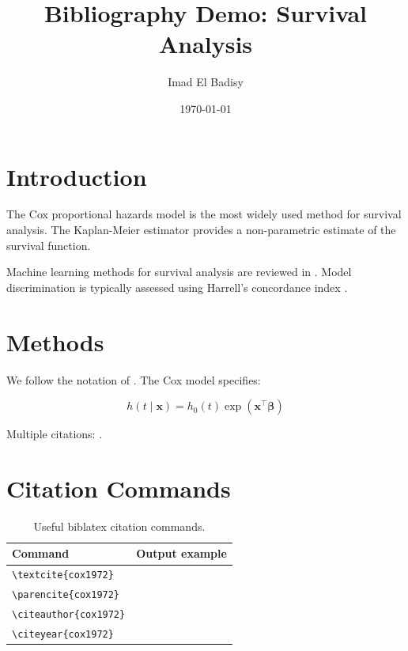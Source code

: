 \documentclass[12pt, a4paper]{article}
\title{Bibliography Demo: Survival Analysis}
\author{Imad El Badisy}
\date{\today}
\begin{document}
\maketitle

\section{Introduction}

The Cox proportional hazards model \parencite{cox1972} is the
most widely used method for survival analysis.
The Kaplan-Meier estimator \parencite{kaplan1958} provides a
non-parametric estimate of the survival function.

Machine learning methods for survival analysis are reviewed
in \textcite{hastie2009}.
Model discrimination is typically assessed using
Harrell's concordance index \parencite{harrell1982}.

\section{Methods}

We follow the notation of \textcite{kalbfleisch2002}.
The Cox model specifies:

\begin{equation}
  h(t \mid \mathbf{x})
    = h_0(t) \exp(\mathbf{x}^\top \boldsymbol{\beta})
\end{equation}

Multiple citations: \parencite{cox1972, kaplan1958, harrell1982}.

\section{Citation Commands}

\begin{table}[htbp]
  \centering
  \caption{Useful biblatex citation commands.}
  \begin{tabular}{ll}
    \toprule
    Command                   & Output example              \\
    \midrule
    \verb|\textcite{cox1972}| & \textcite{cox1972}          \\
    \verb|\parencite{cox1972}| & \parencite{cox1972}        \\
    \verb|\citeauthor{cox1972}| & \citeauthor{cox1972}      \\
    \verb|\citeyear{cox1972}|  & \citeyear{cox1972}         \\
    \bottomrule
  \end{tabular}
\end{table}

\printbibliography
\end{document}
